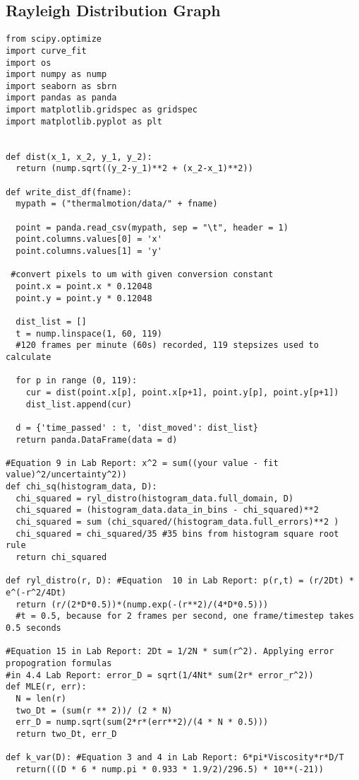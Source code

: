 \documentclass[12pt, letterpaper, twoside]{article}
\begin{document}
\subsection{Rayleigh Distribution Graph}

\begin{verbatim}
from scipy.optimize 
import curve_fit
import os
import numpy as nump
import seaborn as sbrn
import pandas as panda
import matplotlib.gridspec as gridspec
import matplotlib.pyplot as plt


def dist(x_1, x_2, y_1, y_2):
  return (nump.sqrt((y_2-y_1)**2 + (x_2-x_1)**2))

def write_dist_df(fname):
  mypath = ("thermalmotion/data/" + fname)

  point = panda.read_csv(mypath, sep = "\t", header = 1)
  point.columns.values[0] = 'x'
  point.columns.values[1] = 'y'

 #convert pixels to um with given conversion constant
  point.x = point.x * 0.12048 
  point.y = point.y * 0.12048 

  dist_list = []
  t = nump.linspace(1, 60, 119)
  #120 frames per minute (60s) recorded, 119 stepsizes used to calculate

  for p in range (0, 119):
    cur = dist(point.x[p], point.x[p+1], point.y[p], point.y[p+1])
    dist_list.append(cur)

  d = {'time_passed' : t, 'dist_moved': dist_list}
  return panda.DataFrame(data = d)

#Equation 9 in Lab Report: x^2 = sum((your value - fit value)^2/uncertainty^2))
def chi_sq(histogram_data, D):
  chi_squared = ryl_distro(histogram_data.full_domain, D)
  chi_squared = (histogram_data.data_in_bins - chi_squared)**2
  chi_squared = sum (chi_squared/(histogram_data.full_errors)**2 )
  chi_squared = chi_squared/35 #35 bins from histogram square root rule
  return chi_squared

def ryl_distro(r, D): #Equation  10 in Lab Report: p(r,t) = (r/2Dt) * e^(-r^2/4Dt)
  return (r/(2*D*0.5))*(nump.exp(-(r**2)/(4*D*0.5))) 
  #t = 0.5, because for 2 frames per second, one frame/timestep takes 0.5 seconds

#Equation 15 in Lab Report: 2Dt = 1/2N * sum(r^2). Applying error propogration formulas
#in 4.4 Lab Report: error_D = sqrt(1/4Nt* sum(2r* error_r^2))
def MLE(r, err):
  N = len(r)
  two_Dt = (sum(r ** 2))/ (2 * N)
  err_D = nump.sqrt(sum(2*r*(err**2)/(4 * N * 0.5)))
  return two_Dt, err_D
  
def k_var(D): #Equation 3 and 4 in Lab Report: 6*pi*Viscosity*r*D/T
  return(((D * 6 * nump.pi * 0.933 * 1.9/2)/296.5) * 10**(-21))


\end{verbatim}
\end{document}
